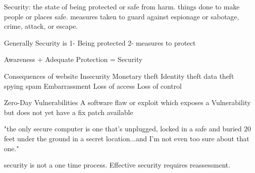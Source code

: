 Security: 
  the state of being protected or safe from harm.
  things done to make people or places safe.
  measures taken to guard against espionage or sabotage, crime, attack, or escape. 

  Generally Security is 
    1- Being protected 
    2- measures to protect
  
  Awareness + Adequate Protection = Security 

Consequences of website Insecurity
  Monetary theft
  Identity theft 
  data theft 
  spying 
  spam 
  Embarrassment 
  Loss of access 
  Loss of control

Zero-Day Vulnerabilities 
  A software flaw or exploit which exposes a Vulnerability but does not yet have a fix patch available 

"the only secure computer is one that's unplugged, locked in a safe and buried
20 feet under the ground in a secret location...and I'm not even too sure about that one."

security is not a one time process. Effective security requires reassessment.